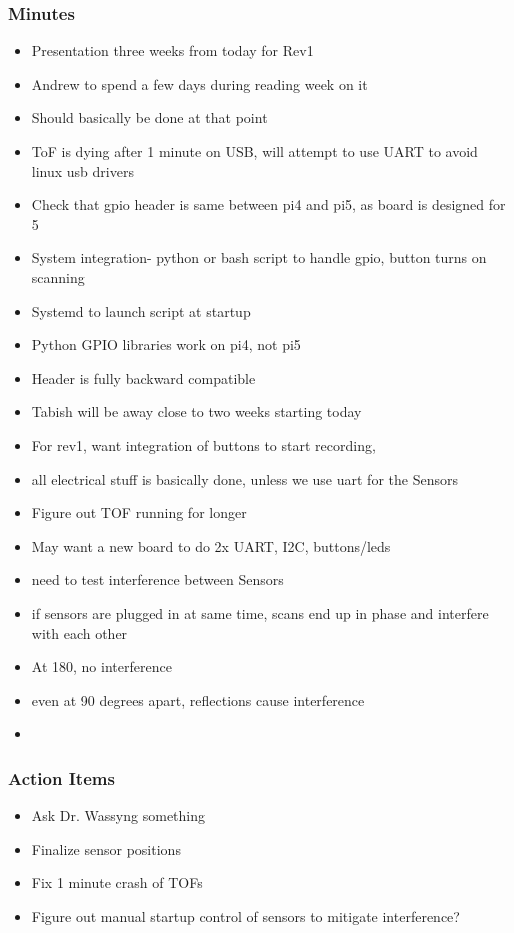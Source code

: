 		\subsubsection*{Minutes}
			\begin{itemize}
				\item Presentation three weeks from today for Rev1
				\item Andrew to spend a few days during reading week on it 
				\item Should basically be done at that point 
				\item ToF is dying after 1 minute on USB, will attempt to use UART to avoid linux usb drivers
				\item Check that gpio header is same between pi4 and pi5, as board is designed for 5
				\item System integration- python or bash script to handle gpio, button turns on scanning
				\item Systemd to launch script at startup
				\item Python GPIO libraries work on pi4, not pi5
				\item Header is fully backward compatible
				\item Tabish will be away close to two weeks starting today
				\item For rev1, want integration of buttons to start recording, 
				\item all electrical stuff is basically done, unless we use uart for the Sensors
				\item Figure out TOF running for longer
				\item May want a new board to do 2x UART, I2C, buttons/leds
				\item need to test interference between Sensors
				\item if sensors are plugged in at same time, scans end up in phase and interfere with each other
				\item At 180, no interference
				\item even at 90 degrees apart, reflections cause interference 
				\item 
			\end{itemize}

		\subsubsection*{Action Items}
			\begin{itemize}
				\item Ask Dr. Wassyng something
				\item Finalize sensor positions
				\item Fix 1 minute crash of TOFs
				\item Figure out manual startup control of sensors to mitigate interference?
			\end{itemize}

